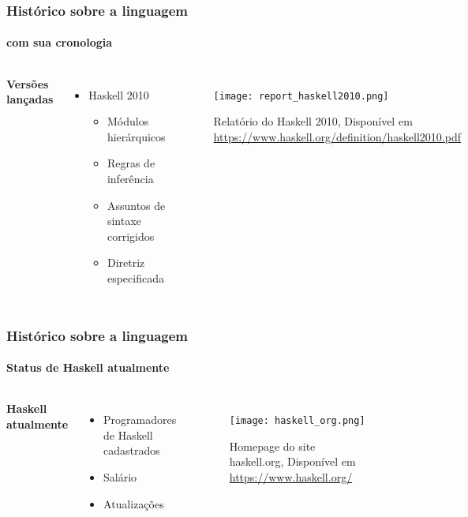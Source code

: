 \documentclass[aspectratio=169]{beamer}
\begin{document}
    \begin{frame}

      \frametitle{Histórico sobre a linguagem}
      \framesubtitle{com sua cronologia}

      \begin{columns}
        \textbf{Versões lançadas} 

        \begin{itemize}
          \item Haskell 2010 
          
          \begin{itemize}
            \item Módulos hierárquicos
            \item Regras de inferência
            \item Assuntos de sintaxe corrigidos
            \item Diretriz especificada     
          \end{itemize}

        \end{itemize}


        \begin{figure}  
          \texttt{[image: report\_haskell2010.png]}
          \caption{\centering Relatório do Haskell 2010, Disponível em \url{https://www.haskell.org/definition/haskell2010.pdf}}
        \end{figure} 

      \end{columns}

    \end{frame}
    \begin{frame}
      
      \frametitle{Histórico sobre a linguagem}
      \framesubtitle{Status de Haskell atualmente}

      \begin{columns}
        \textbf{Haskell atualmente} 

        \begin{itemize}
          \item Programadores de Haskell cadastrados 
          \item Salário 
          \item Atualizações
        \end{itemize}


        \begin{figure}  
          \texttt{[image: haskell\_org.png]}
          \caption{\centering Homepage do site haskell.org, Disponível em \url{https://www.haskell.org/}}
        \end{figure} 

      \end{columns}

    \end{frame}
\end{document}

